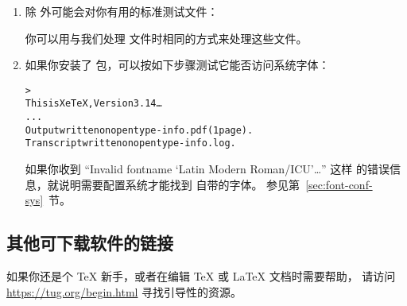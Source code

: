 \documentclass{article}
\begin{document}
\begin{enumerate}
\item 除  外可能会对你有用的标准测试文件：

你可以用与我们处理  文件时相同的方式来处理这些文件。

\item 如果你安装了  包，可以按如下步骤测试它能否访问系统字体：
\begin{alltt}
> 
This is XeTeX, Version 3.14\dots
...
Output written on opentype-info.pdf (1 page).
Transcript written on opentype-info.log.
\end{alltt}

如果你收到 ``Invalid fontname `Latin Modern Roman/ICU'\dots'' 这样
的错误信息，就说明需要配置系统才能找到 \TL{} 自带的字体。
参见第~\ref{sec:font-conf-sys}~节。

\end{enumerate}

\subsection{其他可下载软件的链接}

如果你还是个 \TeX{} 新手，或者在编辑 \TeX{} 或 \LaTeX{} 文档时需要帮助，
请访问 \url{https://tug.org/begin.html} 寻找引导性的资源。
\end{document}
